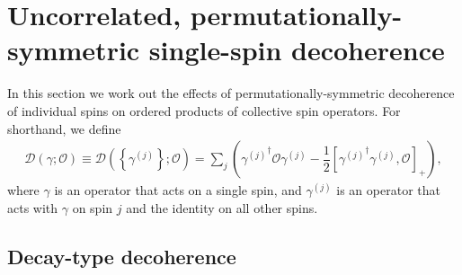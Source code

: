 \documentclass[aps,notitlepage,nofootinbib,11pt]{revtex4-1}
\newcommand{\f}[2]{\dfrac{#1}{#2}} %
\newcommand{\p}[1]{\left(#1\right)} %
\renewcommand{\sp}[1]{\left[#1\right]} %
\renewcommand{\set}[1]{\left\{#1\right\}} %
\newcommand{\D}{\mathcal{D}}
\renewcommand{\O}{\mathcal{O}}
\newcommand{\1}{\mathds{1}}
\begin{document}
\section{Uncorrelated, permutationally-symmetric single-spin
  decoherence}
\label{sec:decoherence_single}

In this section we work out the effects of permutationally-symmetric
decoherence of individual spins on ordered products of collective spin
operators.  For shorthand, we define
\begin{align}
  \D\p{\gamma;\O} \equiv \D\p{\set{\gamma^{(j)}};\O}
  = \sum_j\p{{\gamma^{(j)}}^\dag \O \gamma^{(j)}
    - \f12\sp{{\gamma^{(j)}}^\dag \gamma^{(j)}, \O}_+},
\end{align}
where $\gamma$ is an operator that acts on a single spin, and
$\gamma^{(j)}$ is an operator that acts with $\gamma$ on spin $j$ and
the identity on all other spins.


\subsection{Decay-type decoherence}
\label{sec:decay_single}
\end{document}
